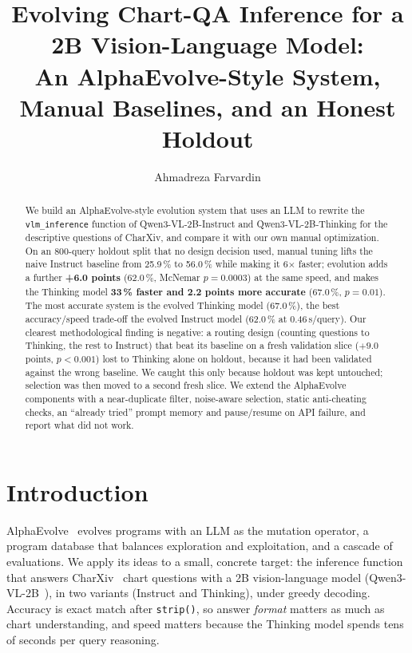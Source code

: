 \documentclass{article}
\title{Evolving Chart-QA Inference for a 2B Vision-Language Model:\\
An AlphaEvolve-Style System, Manual Baselines, and an Honest Holdout}
\author{Ahmadreza Farvardin}
\begin{document}
\maketitle

\begin{abstract}
We build an AlphaEvolve-style evolution system that uses an LLM to rewrite the \texttt{vlm\_inference} function of
Qwen3-VL-2B-Instruct and Qwen3-VL-2B-Thinking for the descriptive questions of CharXiv, and compare it with our own
manual optimization. On an 800-query holdout split that no design decision used, manual tuning lifts the naive
Instruct baseline from 25.9\,\% to 56.0\,\% while making it 6$\times$ faster; evolution adds a further
\textbf{+6.0 points} (62.0\,\%, McNemar $p=0.0003$) at the same speed, and makes the Thinking model
\textbf{33\,\% faster and 2.2 points more accurate} (67.0\,\%, $p=0.01$). The most accurate system is the evolved
Thinking model (67.0\,\%), the best accuracy/speed trade-off the evolved Instruct model (62.0\,\% at 0.46\,s/query).
Our clearest methodological finding is negative: a routing design (counting questions to Thinking, the rest to
Instruct) that beat its baseline on a fresh validation slice ($+9.0$ points, $p<0.001$) lost to Thinking alone on
holdout, because it had been validated against the wrong baseline. We caught this only because holdout was kept
untouched; selection was then moved to a second fresh slice. We extend the AlphaEvolve components with a
near-duplicate filter, noise-aware selection, static anti-cheating checks, an ``already tried'' prompt memory and
pause/resume on API failure, and report what did not work.
\end{abstract}

\section{Introduction}

AlphaEvolve~\citep{alphaevolve} evolves programs with an LLM as the mutation operator, a program database that
balances exploration and exploitation, and a cascade of evaluations. We apply its ideas to a small, concrete target:
the inference function that answers CharXiv~\citep{charxiv} chart questions with a 2B vision-language model
(Qwen3-VL-2B~\citep{qwen3vl}), in two variants (Instruct and Thinking), under greedy decoding. Accuracy is exact match
after \texttt{strip()}, so answer \emph{format} matters as much as chart understanding, and speed matters because the
Thinking model spends tens of seconds per query reasoning.
\end{document}
